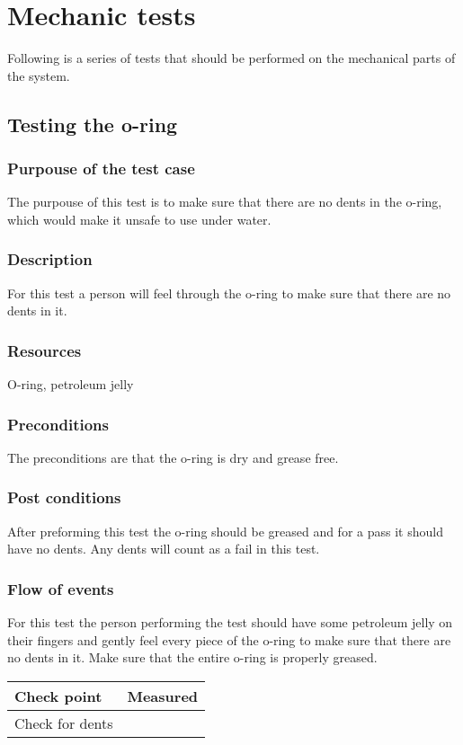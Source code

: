 \section{Mechanic tests}
Following is a series of tests that should be performed on the mechanical parts of the system. 

\subsection{Testing the o-ring}
\label{oring}
\subsubsection*{Purpouse of the test case}
The purpouse of this test is to make sure that there are no dents in the o-ring, which would make it unsafe to use under water. 
\subsubsection*{Description}
For this test a person will feel through the o-ring to make sure that there are no dents in it. 
\subsubsection*{Resources}
O-ring, petroleum jelly
\subsubsection*{Preconditions}
The preconditions are that the o-ring is dry and grease free. 
\subsubsection*{Post conditions}
After preforming this test the o-ring should be greased and for a pass it should have no dents. Any dents will count as a fail in this test. 
\subsubsection*{Flow of events}
For this test the person performing the test should have some petroleum jelly on their fingers and gently feel every piece of the o-ring to make sure that there are no dents in it. Make sure that the entire o-ring is properly greased. 

\begin{tabular}{| l | c |}
\hline
Check point & Measured \\ \hline
Check for dents &  \\ \hline
\end{tabular}
